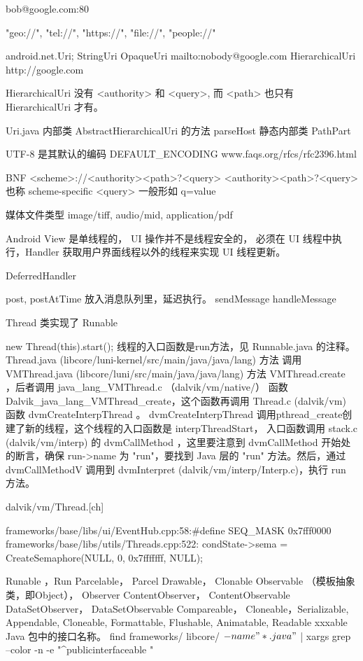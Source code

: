 \documentclass{book}
\begin{document}
\begin{CJK}{UTF8}{gbsn}
{bob@google.com:80


"geo://", "tel://", "https://", "file://", "people://"

android.net.Uri;
StringUri
OpaqueUri                 mailto:nobody@google.com
HierarchicalUri           http://google.com

HierarchicalUri 没有 <authority> 和 <query>, 而 <path> 也只有 HierarchicalUri
才有。


Uri.java 内部类  AbstractHierarchicalUri 的方法 parseHost
静态内部类 PathPart 


UTF-8 是其默认的编码 DEFAULT_ENCODING
www.faqs.org/rfcs/rfc2396.html

BNF
<scheme>://<authority><path>?<query>
<authority><path>?<query> 也称 scheme-specific
<query> 一般形如 q=value

媒体文件类型
image/tiff, audio/mid, application/pdf



Android View 是单线程的， UI 操作并不是线程安全的， 必须在 UI 线程中执行，Handler 获取用户界面线程以外的线程来实现 UI 线程更新。

DeferredHandler

post, postAtTime  放入消息队列里，延迟执行。
sendMessage   handleMessage

Thread 类实现了 Runable

new Thread(this).start();
线程的入口函数是run方法，见 Runnable.java 的注释。
Thread.java  (libcore/luni-kernel/src/main/java/java/lang)  方法 
调用
VMThread.java (libcore/luni/src/main/java/java/lang) 方法 VMThread.create
，后者调用
java_lang_VMThread.c （dalvik/vm/native/）
函数Dalvik_java_lang_VMThread_create，这个函数再调用
Thread.c (dalvik/vm) 函数 dvmCreateInterpThread 。 dvmCreateInterpThread
调用pthread_create创建了新的线程，这个线程的入口函数是 interpThreadStart，
入口函数调用 stack.c (dalvik/vm/interp) 的 dvmCallMethod ，这里要注意到
dvmCallMethod 开始处的断言，确保 run->name 为 "run"，要找到 Java 层的 "run"
方法。然后，通过 dvmCallMethodV 调用到 dvmInterpret
(dalvik/vm/interp/Interp.c)，执行 run 方法。

dalvik/vm/Thread.[ch]


frameworks/base/libs/ui/EventHub.cpp:58:#define SEQ_MASK 0x7fff0000
frameworks/base/libs/utils/Threads.cpp:522:    condState->sema = CreateSemaphore(NULL, 0, 0x7fffffff, NULL);


Runable ，Run
Parcelable， Parcel
Drawable， 
Clonable
Observable （模板抽象类，即Object）， Observer
ContentObserver，  ContentObservable
DataSetObserver，  DataSetObservable
Compareable， Cloneable，Serializable, Appendable, Cloneable, Formattable,
Flushable,   Animatable, Readable
xxxable Java 包中的接口名称。
find frameworks/ libcore/   \( -name "*.java" \) | xargs grep --color -n -e "^\s*public\s*interface\s*\w*able "

}
\end{CJK}
\end{document}

